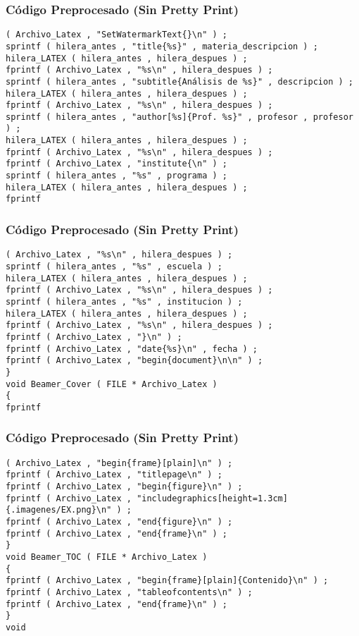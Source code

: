 \documentclass{beamer}
\begin{document}
\begin{frame}[fragile]
\frametitle{C\'odigo Preprocesado (Sin Pretty Print)}
\begin{lstlisting}[style=CStyle]
( Archivo_Latex , "SetWatermarkText{}\n" ) ; 
sprintf ( hilera_antes , "title{%s}" , materia_descripcion ) ; 
hilera_LATEX ( hilera_antes , hilera_despues ) ; 
fprintf ( Archivo_Latex , "%s\n" , hilera_despues ) ; 
sprintf ( hilera_antes , "subtitle{Análisis de %s}" , descripcion ) ; 
hilera_LATEX ( hilera_antes , hilera_despues ) ; 
fprintf ( Archivo_Latex , "%s\n" , hilera_despues ) ; 
sprintf ( hilera_antes , "author[%s]{Prof. %s}" , profesor , profesor ) ; 
hilera_LATEX ( hilera_antes , hilera_despues ) ; 
fprintf ( Archivo_Latex , "%s\n" , hilera_despues ) ; 
fprintf ( Archivo_Latex , "institute{\n" ) ; 
sprintf ( hilera_antes , "%s" , programa ) ; 
hilera_LATEX ( hilera_antes , hilera_despues ) ; 
fprintf \end{lstlisting}
\end{frame}
\begin{frame}[fragile]
\frametitle{C\'odigo Preprocesado (Sin Pretty Print)}
\begin{lstlisting}[style=CStyle]
( Archivo_Latex , "%s\n" , hilera_despues ) ; 
sprintf ( hilera_antes , "%s" , escuela ) ; 
hilera_LATEX ( hilera_antes , hilera_despues ) ; 
fprintf ( Archivo_Latex , "%s\n" , hilera_despues ) ; 
sprintf ( hilera_antes , "%s" , institucion ) ; 
hilera_LATEX ( hilera_antes , hilera_despues ) ; 
fprintf ( Archivo_Latex , "%s\n" , hilera_despues ) ; 
fprintf ( Archivo_Latex , "}\n" ) ; 
fprintf ( Archivo_Latex , "date{%s}\n" , fecha ) ; 
fprintf ( Archivo_Latex , "begin{document}\n\n" ) ; 
} 
void Beamer_Cover ( FILE * Archivo_Latex ) 
{ 
fprintf \end{lstlisting}
\end{frame}
\begin{frame}[fragile]
\frametitle{C\'odigo Preprocesado (Sin Pretty Print)}
\begin{lstlisting}[style=CStyle]
( Archivo_Latex , "begin{frame}[plain]\n" ) ; 
fprintf ( Archivo_Latex , "titlepage\n" ) ; 
fprintf ( Archivo_Latex , "begin{figure}\n" ) ; 
fprintf ( Archivo_Latex , "includegraphics[height=1.3cm]{.imagenes/EX.png}\n" ) ; 
fprintf ( Archivo_Latex , "end{figure}\n" ) ; 
fprintf ( Archivo_Latex , "end{frame}\n" ) ; 
} 
void Beamer_TOC ( FILE * Archivo_Latex ) 
{ 
fprintf ( Archivo_Latex , "begin{frame}[plain]{Contenido}\n" ) ; 
fprintf ( Archivo_Latex , "tableofcontents\n" ) ; 
fprintf ( Archivo_Latex , "end{frame}\n" ) ; 
} 
void \end{lstlisting}
\end{frame}
\end{document}

